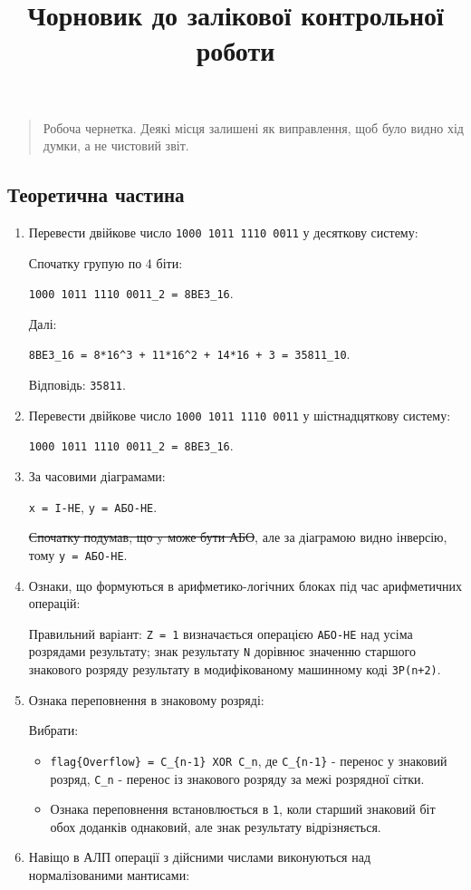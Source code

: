 \documentclass[
  11pt,
]{article}
\title{Чорновик до залікової контрольної роботи}
\author{}
\date{}
\providecommand{\tightlist}{%
  \setlength{\itemsep}{0pt}\setlength{\parskip}{0pt}}
\begin{document}
\maketitle

\begin{quote}
Робоча чернетка. Деякі місця залишені як виправлення, щоб було видно хід думки, а не чистовий звіт.
\end{quote}

\subsection{Теоретична частина}\label{ux442ux435ux43eux440ux435ux442ux438ux447ux43dux430-ux447ux430ux441ux442ux438ux43dux430}

\begin{enumerate}
\def\labelenumi{\arabic{enumi}.}
\item
  Перевести двійкове число \texttt{1000\ 1011\ 1110\ 0011} у десяткову систему:

  Спочатку групую по 4 біти:

  \texttt{1000\ 1011\ 1110\ 0011\_2\ =\ 8BE3\_16}.

  Далі:

  \texttt{8BE3\_16\ =\ 8*16\^{}3\ +\ 11*16\^{}2\ +\ 14*16\ +\ 3\ =\ 35811\_10}.

  Відповідь: \texttt{35811}.
\item
  Перевести двійкове число \texttt{1000\ 1011\ 1110\ 0011} у шістнадцяткову систему:

  \texttt{1000\ 1011\ 1110\ 0011\_2\ =\ 8BE3\_16}.
\item
  За часовими діаграмами:

  \texttt{x\ =\ І-НЕ}, \texttt{y\ =\ АБО-НЕ}.

  \st{Спочатку подумав, що y може бути АБО}, але за діаграмою видно інверсію, тому \texttt{y\ =\ АБО-НЕ}.
\item
  Ознаки, що формуються в арифметико-логічних блоках під час арифметичних операцій:

  Правильний варіант: \texttt{Z\ =\ 1} визначається операцією \texttt{АБО-НЕ} над усіма розрядами результату; знак результату \texttt{N} дорівнює значенню старшого знакового розряду результату в модифікованому машинному коді \texttt{ЗР(n+2)}.
\item
  Ознака переповнення в знаковому розряді:

  Вибрати:

  \begin{itemize}
  \tightlist
  \item
    \texttt{flag\{Overflow\}\ =\ C\_\{n-1\}\ XOR\ C\_n}, де \texttt{C\_\{n-1\}} - перенос у знаковий розряд, \texttt{C\_n} - перенос із знакового розряду за межі розрядної сітки.
  \item
    Ознака переповнення встановлюється в \texttt{1}, коли старший знаковий біт обох доданків однаковий, але знак результату відрізняється.
  \end{itemize}
\item
  Навіщо в АЛП операції з дійсними числами виконуються над нормалізованими мантисами:


\end{enumerate}
\end{document}
